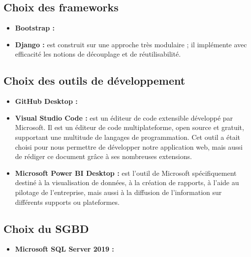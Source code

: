         \subsection[Choix des frameworks]{Choix des frameworks}
            \begin{itemize}
                \setlength{\itemsep}{0pt}
                \item [\ding{226}] \textbf{Bootstrap :}
                \item [\ding{226}] \textbf{Django :} est construit sur une approche très modulaire ; il implémente avec efficacité
                les notions de découplage et de réutilisabilité.
            \end{itemize}
        \subsection[Choix des outils de développement]{Choix des outils de développement}
            \begin{itemize}
                \setlength{\itemsep}{0pt}
                \item [\ding{226}] \textbf{GitHub Desktop :}
                \item [\ding{226}] \textbf{Visual Studio Code :} est un éditeur de code
                extensible développé par Microsoft. Il est un éditeur de code multiplateforme, open source et gratuit,
                supportant une multitude de langages de programmation. \cite*{Wikivsc} Cet outil a était choisi
                pour nous permettre de développer notre application web, mais aussi de rédiger ce document grâce à
                ses nombreuses extensions.
                \item [\ding{226}] \textbf{Microsoft Power BI Desktop :} est l’outil de Microsoft spécifiquement destiné à la visualisation de
                données, à la création de rapports, à l’aide au pilotage de l’entreprise, mais aussi à la
                diffusion de l’information sur différents supports ou plateformes. \cite*{Meyer2021}
            \end{itemize}
        \subsection[Choix du SGBD]{Choix du SGBD}
            \begin{itemize}
                \setlength{\itemsep}{0pt}
                \item [\ding{226}] \textbf{Microsoft SQL Server 2019 :}
            \end{itemize}
